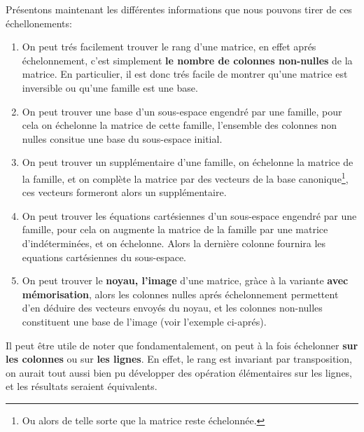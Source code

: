 Présentons maintenant les différentes informations que nous pouvons tirer de ces échellonements:

\begin{enumerate}
   \item On peut trés facilement trouver le rang d'une matrice, en effet aprés échelonnement, c'est simplement \textbf{le nombre de colonnes non-nulles} de la matrice. En particulier, il est donc trés facile de montrer qu'une matrice est inversible ou qu'une famille est une base.
   \item On peut trouver une base d'un sous-espace engendré par une famille, pour cela on échelonne la matrice de cette famille, l'ensemble des colonnes non nulles consitue une base du sous-espace initial.
   \item On peut trouver un supplémentaire d'une famille, on échelonne la matrice de la famille, et on complète la matrice par des vecteurs de la base canonique\footnote[2]{Ou alors de telle sorte que la matrice reste échelonnée.}, ces vecteurs formeront alors un supplémentaire.
   \item On peut trouver les équations cartésiennes d'un sous-espace engendré par une famille, pour cela on augmente la matrice de la famille par une matrice d'indéterminées, et on échelonne. Alors la dernière colonne fournira les equations cartésiennes du sous-espace.
   \item On peut trouver le \textbf{noyau, l'image} d'une matrice, gràce à la variante \textbf{avec mémorisation}, alors les colonnes nulles aprés échelonnement permettent d'en déduire des vecteurs envoyés du noyau, et les colonnes non-nulles constituent une base de l'image (voir l'exemple ci-aprés).
\end{enumerate}
Il peut être utile de noter que fondamentalement, on peut à la fois échelonner \textbf{sur les colonnes} ou sur \textbf{les lignes}. En effet, le rang est invariant par transposition, on aurait tout aussi bien pu développer des opération élémentaires sur les lignes, et les résultats seraient équivalents.

\pagebreak

